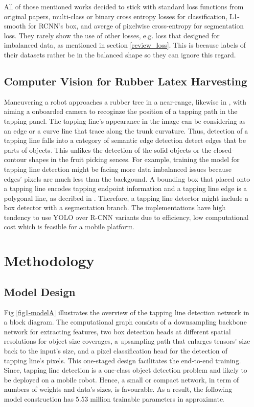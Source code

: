 \documentclass[default,pdflatex,iicol]{sn-jnl}%
\begin{document}
All of those mentioned works decided to stick with standard loss functions from original papers, multi-class or binary cross entropy losses for classification, L1-smooth for RCNN's box, and averge of pixelwise cross-entropy for segmentation loss. They rarely show the use of other losses, e.g. loss that designed for imbalanced data, as mentioned in section \ref{review_loss}. This is because labels of their datasets rather be in the balanced shape so they can ignore this regard.

\subsection{Computer Vision for Rubber Latex Harvesting}
Maneuvering a robot approaches a rubber tree in a near-range, likewise in \cite{zhang2019rubber, WANG2022103906}, with aiming a onboarded camera to recoginze the position of a tapping path in the tapping panel. The tapping line's appearance in the image can be considering as an edge or a curve line that trace along the trunk curvature. Thus, detection of a tapping line falls into a category of semantic edge detection \textemdash detect edges that be parts of objects. This unlikes the detection of the solid objects or the closed-contour shapes in the fruit picking sences. For example, training the model for tapping line detection might be facing more data imbalanced issues because edges' pixels are much less than the backgound. A bounding box that placed onto a tapping line encodes tapping endpoint information and a tapping line edge is a polygonal line, as decribed in \cite{Wongtanawijit_2021}. Therefore, a tapping line detector might include a box detector with a segmentation branch. The implementations have high tendency to use YOLO over R-CNN variants due to efficiency, low computational cost which is feasible for a mobile platform.


\section{Methodology}\label{sec-methodology}


\subsection{Model Design}\label{subsec-model}
Fig \ref{fig1-modelA} illustrates the overview of the tapping line detection network in a block diagram. The computational graph consists of a downsampling backbone network for extracting features, two box detection heads at different spatial resolutions for object size coverages, a upsampling path that enlarges tensors' size back to the input's size, and a pixel classification head for the detection of tapping line's pixels. This one-staged design facilitates the end-to-end training. Since, tapping line detection is a one-class object detection problem and likely to be deployed on a mobile robot. Hence, a small or compact network, in term of numbers of weights and data's sizes, is favourable. As a result, the following model construction has 5.53 million trainable parameters in approximate.
\end{document}
